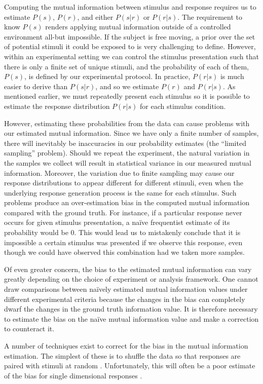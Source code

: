 Computing the mutual information between stimulus and response requires us to estimate $P(s)$, $P(r)$, and either $P(s|r)$ or $P(r|s)$.
The requirement to know $P(s)$ renders applying mutual information outside of a controlled environment all-but impossible.
If the subject is free moving, a prior over the set of potential stimuli it could be exposed to is very challenging to define.
However, within an experimental setting we can control the stimulus presentation such that there is only a finite set of unique stimuli, and the probability of each of them, $P(s)$, is defined by our experimental protocol.
In practice, $P(r|s)$ is much easier to derive than $P(s|r)$, and so we estimate $P(r)$ and $P(r|s)$.
As mentioned earlier, we must repeatedly present each stimulus so it is possible to estimate the response distribution $P(r|s)$ for each stimulus condition.

However, estimating these probabilities from the data can cause problems with our estimated mutual information.
Since we have only a finite number of samples, there will inevitably be inaccuracies in our probability estimates (the ``limited sampling'' problem).
Should we repeat the experiment, the natural variation in the samples we collect will result in statistical variance in our measured mutual information.
Moreover, the variation due to finite sampling may cause our response distributions to appear different for different stimuli, even when the underlying response generation process is the same for each stimulus.
Such problems produce an over-estimation bias in the computed mutual information compared with the ground truth.
For instance, if a particular response never occurs for given stimulus presentation, a na{\"i}ve frequentist estimate of its probability would be $0$.
This would lead us to mistakenly conclude that it is impossible a certain stimulus was presented if we observe this response, even though we could have observed this combination had we taken more samples.

Of even greater concern, the bias to the estimated mutual information can vary greatly depending on the choice of experiment or analysis framework.
One cannot draw comparisons between na{\"i}vely estimated mutual information values under different experimental criteria because the changes in the bias can completely dwarf the changes in the ground truth information value.
It is therefore necessary to estimate the bias on the na{\"i}ve mutual information value and make a correction to counteract it.

A number of techniques exist to correct for the bias in the mutual information estimation.
The simplest of these is to shuffle the data so that responses are paired with stimuli at random \citep{Optican1991}.
Unfortunately, this will often be a poor estimate of the bias for single dimensional responses \citep{Panzeri1996}.

